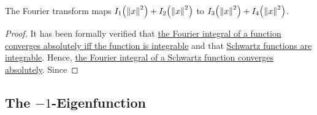 \begin{boxlemma}
    The Fourier transform %
    maps $I_1\!\left( \left\lVert x \right\rVert^2 \right) + I_2\!\left( \left\lVert x \right\rVert^2 \right)$ to $I_3\!\left( \left\lVert x \right\rVert^2 \right) + I_4\!\left( \left\lVert x \right\rVert^2 \right)$.
\end{boxlemma}
\begin{proof}
    It has been formally verified that \href{https://github.com/leanprover-community/mathlib4/blob/5a2eaa85c555c4263e15928cef249cbaad2eb2d2/Mathlib/Analysis/Fourier/FourierTransform.lean#L360-L362}{the Fourier integral of a function converges absolutely iff the function is integrable} and that \href{https://github.com/leanprover-community/mathlib4/blob/5a2eaa85c555c4263e15928cef249cbaad2eb2d2/Mathlib/Analysis/Distribution/SchwartzSpace.lean#L1095-L1097}{Schwartz functions are integrable}. Hence, \href{https://github.com/leanprover-community/mathlib4/blob/5a2eaa85c555c4263e15928cef249cbaad2eb2d2/Mathlib/Analysis/Distribution/FourierSchwartz.lean#L36}{the Fourier integral of a Schwartz function converges absolutely}. Since 
\end{proof}

\subsection{The $-1$-Eigenfunction}